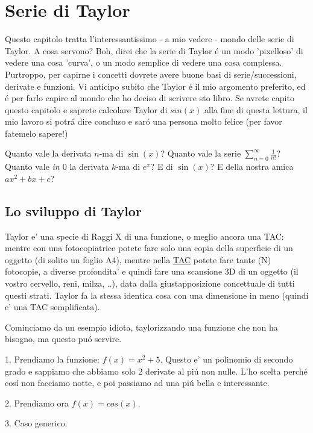 \label{taylor}
\chapter{Serie di Taylor}

Questo capitolo tratta l'interessantissimo - a mio vedere - mondo delle serie di Taylor. A cosa servono?
Boh, direi che la serie di Taylor \'e un modo 'pixelloso' di vedere una cosa 'curva', o un modo semplice
di vedere una cosa complessa. Purtroppo, per capirne i concetti dovrete avere buone basi di serie/successioni,
derivate e funzioni. Vi anticipo subito che Taylor \'e il mio argomento preferito, ed \'e per farlo capire
al mondo che ho deciso di scrivere sto libro. Se avrete capito questo capitolo e saprete calcolare Taylor di $sin(x)$
alla fine di questa lettura, il mio lavoro si potr\'a dire concluso e sar\'o una persona molto felice (per favor
fatemelo sapere!)

\begin{prerequisito}
Quanto vale la derivata $n$-ma di $\sin(x)$? Quanto vale la serie $\sum_{n=0}^\infty \frac{1}{n!}$? Quanto vale {\em in $0$} la derivata $k$-ma di $e^x$? E di $\sin(x)$? E della nostra amica $ax^2+bx+c$?
\end{prerequisito}


\section{Lo sviluppo di Taylor}

Taylor e' una specie di Raggi X di una funzione, o meglio ancora una TAC: mentre con una fotocopiatrice potete fare solo una copia della superficie di un oggetto (di solito un foglio A4),
mentre nella  \href{https://it.wikipedia.org/wiki/Tomografia_computerizzata}{TAC} potete fare tante (N) fotocopie,
a diverse profondita' e quindi fare una scansione 3D di un oggetto (il vostro cervello, reni, milza, ..), data dalla giustapposizione
concettuale di tutti questi strati. Taylor fa la stessa identica cosa con una dimensione in meno (quindi e' una TAC semplificata). 

Cominciamo da un esempio idiota, taylorizzando una funzione che non ha bisogno, ma questo pu\'o servire. 


1. Prendiamo la funzione: $f(x) = x^2 + 5$. Questo e' un polinomio di secondo grado e sappiamo che abbiamo solo 2 derivate al pi\'u non nulle.
L'ho scelta perch\'e cos\'i non facciamo notte, e poi passiamo ad una pi\'u bella e interessante.






2. Prendiamo ora $f(x) = cos(x)$.




3. Caso generico.